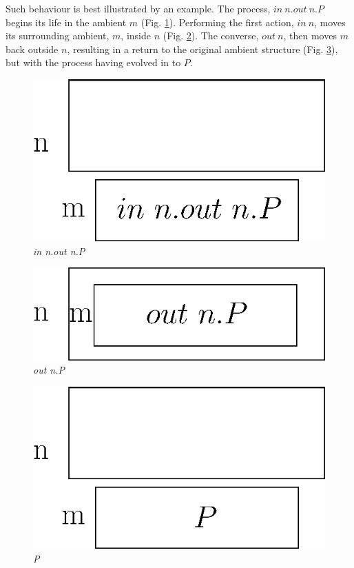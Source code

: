 Such behaviour is best illustrated by an example. The process, $in\
n.out\ n.P$ begins its life in the ambient $m$
(Fig. \ref{fig:ambient1}).  Performing the first action, $in\ n$,
moves its surrounding ambient, $m$, inside $n$
(Fig. \ref{fig:ambient2}).  The converse, $out\ n$, then moves $m$
back outside $n$, resulting in a return to the original ambient
structure (Fig. \ref{fig:ambient3}), but with the process having
evolved in to $P$.

\begin{figure}  
  \centering
  \includegraphics{ambient1}
  \caption{\textit{in n.out n.P}}
  \label{fig:ambient1}
\end{figure}

\begin{figure}  
  \centering
  \includegraphics{ambient2}
  \caption{\textit{out n.P}}
  \label{fig:ambient2}
\end{figure}

\begin{figure}  
  \centering
  \includegraphics{ambient3}
  \caption{\textit{P}}
  \label{fig:ambient3}
\end{figure}

